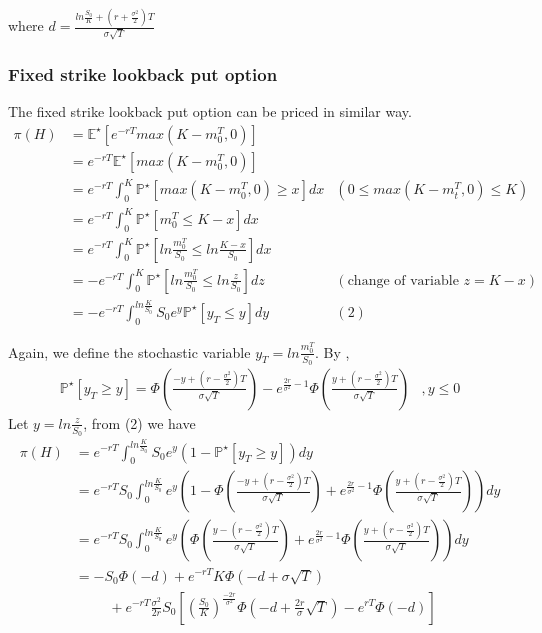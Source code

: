 \documentclass{article}
\begin{document}
where $d = \frac{ln\frac{S_0}{K} + (r+\frac{\sigma^2}{2})T}{\sigma\sqrt{T}}$

\subsubsection{Fixed strike lookback put option
}
The fixed strike lookback put option can be priced in similar way.
\begin{align*}
\pi(H) 	&= \mathbb{E^{\star}}[e^{-rT} max(K - m_{0}^T, 0)] \\
			&= e^{-rT} \mathbb{E^{\star}}[max(K - m_{0}^T, 0)] \\
			&= e^{-rT} \int_{0}^{K} \mathbb{P}^{\star}[max(K - m_{0}^T, 0) \geq x]dx  &(0 \leq max(K - m_{t}^{T}, 0) \leq K)\\
			&= e^{-rT} \int_{0}^{K} \mathbb{P}^{\star}[m_{0}^T \leq K-x]dx \\
			&= e^{-rT} \int_{0}^{K} \mathbb{P}^{\star}[ln \frac{m_{0}^T}{S_0} \leq ln \frac{K-x}{S_0}]dx \\
			&= -e^{-rT} \int_{0}^{K} \mathbb{P}^{\star}[ln \frac{m_{0}^T}{S_0} \leq ln \frac{z}{S_0}]dz &(\text{change of variable } z=K-x) \\
			&= -e^{-rT} \int_{0}^{ln\frac{K}{S_0}} S_0e^{y} \mathbb{P}^{\star}[y_T \leq y]dy &(2)
\end{align*}

Again, we define the stochastic variable $y_T= ln \frac{m_{0}^{T}}{S_0}$. By \cite{Peter1},
\begin{align*}
\mathbb{P}^{\star}[y_T \geq y]= \Phi \left(\frac{-y+(r-\frac{\sigma^2}{2})T}{\sigma\sqrt{T}} \right) - e^{\frac{2r}{\sigma^2} - 1} \Phi \left(\frac{y+(r-\frac{\sigma^2}{2})T}{\sigma\sqrt{T}} \right)
&, y \leq 0
\end{align*}
Let $y=ln\frac{z}{S_0}$, from (2) we have
\begin{align*}
\pi(H) 	&= e^{-rT} \int_{0}^{ln\frac{K}{S_0}} S_0e^y( 1 - \mathbb{P}^{\star}[y_T \geq y])dy \\
			&= e^{-rT}S_0 \int_{0}^{ln\frac{K}{S_0}}  e^y \left( 1 -  
			\Phi \left(\frac{-y+(r-\frac{\sigma^2}{2})T}{\sigma\sqrt{T}} \right) + e^{\frac{2r}{\sigma^2} - 1} \Phi \left(\frac{y+(r-\frac{\sigma^2}{2})T}{\sigma\sqrt{T}} \right)
			\right) dy \\
			&= e^{-rT}S_0 \int_{0}^{ln\frac{K}{S_0}} e^y \left( 
			\Phi \left(\frac{y-(r-\frac{\sigma^2}{2})T}{\sigma\sqrt{T}} \right) + e^{\frac{2r}{\sigma^2} - 1} \Phi \left(\frac{y+(r-\frac{\sigma^2}{2})T}{\sigma\sqrt{T}} \right)
			\right) dy \\
			&= -S_0 \Phi(-d) + e^{-rT}K \Phi(-d + \sigma \sqrt{T} ) \\
			&\hspace{1cm} + e^{-rT}\frac{\sigma^2}{2r}S_0 \left[
			\left(\frac{S_0}{K}\right)^{\frac{-2r}{\sigma^2}} \Phi\left(-d+ \frac{2r}{\sigma}\sqrt{T} \right) - e^{rT}\Phi(-d)
			\right]
\end{align*}
\end{document}
